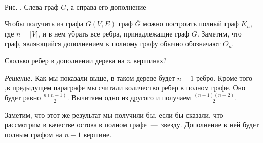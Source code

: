 \begin{center}
\;\ \;\ \;\ \;\ \;\ \;\ \;\ \;\ \;\ \;\ \;\ \;\ \;\
\newline
\newline
	\small Рис. \images. Слева граф $G$, а справа его дополнение
\end{center}

	Чтобы получить из графа $G(V, E)$ граф $\overline{G}$ можно построить полный граф $K_n$, где $n = |V|$, и в нем убрать все ребра, принадлежащие граф $G$. Заметим, что граф, являющийся дополнением к полному графу обычно обозначают $O_n$.

\begin{example}
	Сколько ребер в дополнении дерева на $n$ вершинах?
	
	\emph{Решение.} Как мы показали выше, в таком дереве будет $n-1$ ребро. Кроме того ,в предыдущем параграфе мы считали количество ребер в полном графе. Оно будет равно $\frac{n(n-1)}{2}$. Вычитаем одно из другого и получаем $\frac{(n-1)(n-2)}{2}$.
	
	Заметим, что этот же результат мы получили бы, если бы сказали, что рассмотрим в качестве остова в полном графе~---~звезду. Дополнение к ней будет полным графом на $n-1$ вершине.
\end{example}

